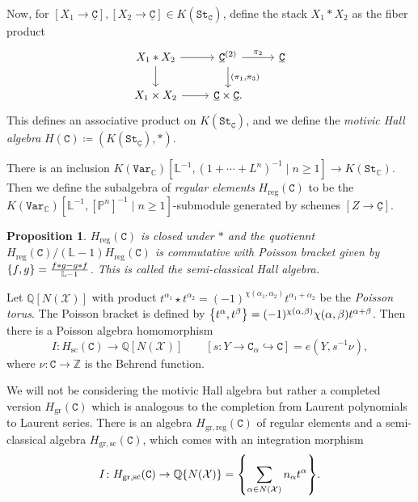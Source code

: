 \documentclass[leqno, openany]{memoir}
\newtheorem{prop}[thm]{Proposition}
\theoremstyle{definition}
\theoremstyle{remark}
\theoremstyle{plain}
\theoremstyle{definition}
\theoremstyle{remark}
\newcommand{\C}{\mathbb{C}}
\newcommand{\Z}{\mathbb{Z}}
\newcommand{\Q}{\mathbb{Q}}
\renewcommand{\L}{\mathbb{L}}
\renewcommand{\P}{\mathbb{P}}
\newcommand{\mc}[1]{\mathcal{#1}}
\newcommand{\mr}[1]{\mathrm{#1}}
\newcommand{\mt}[1]{\mathtt{#1}}
\newcommand{\ul}[1]{\underline{#1}}
\begin{document}
Now, for $[X_1 \to \mt{\ul{C}}], [X_2 \to \mt{\ul{C}}] \in K(\mt{St}_{\mt{\ul{C}}})$, define the stack $X_1 * X_2$ as the fiber product
\begin{equation*}
\begin{tikzcd}
    X_1 * X_2 \ar{r} \ar{d} & \mt{\ul{C}}^{(2)} \ar{r}{\pi_2} \ar{d}{(\pi_1, \pi_3)} & \mt{\ul{C}} \\
    X_1 \times X_2 \ar{r} & \mt{\ul{C}} \times \mt{\ul{C}}.
\end{tikzcd}
\end{equation*}
This defines an associative product on $K(\mt{St}_{\mt{\ul{C}}})$, and we define the \textit{motivic Hall algebra} $H(\mt{C}) \coloneqq (K(\mt{St}_{\mt{\ul{C}}}), *)$.

There is an inclusion $K(\mt{Var}_{\C})[\L^{-1}, (1 + \cdots + L^n)^{-1} \mid n \geq 1] \to K(\mt{St}_{\C})$. Then we define the subalgebra of \textit{regular elements} $H_{\mr{reg}}(\mt{C})$ to be the $K(\mt{Var}_{\C})[\L^{-1}, [\P^n]^{-1} \mid n \geq 1]$-submodule generated by schemes $[Z \to \mt{\ul{C}}]$.

\begin{prop}
    $H_{\mr{reg}}(\mt{C})$ is closed under $*$ and the quotiennt $H_{\mr{reg}}(\mt{C}) / (\L - 1) H_{\mr{reg}}(\mt{C})$ is commutative with Poisson bracket given by $\qty{f, g} = \frac{f * g - g * f}{\L - 1}$. This is called the \textit{semi-classical Hall algebra}.
\end{prop}

Let $\Q[N(\mc{X})]$ with product $t^{\alpha_1} \star t^{\alpha_2} = (-1)^{\chi(\alpha_1, \alpha_2)} t^{\alpha_1 + \alpha_2}$ be the \textit{Poisson torus}. The Poisson bracket is defined by $\qty{t^{\alpha}, t^{\beta}} = (-1)^{\chi(\alpha, \beta)} \chi(\alpha, \beta) t^{\alpha + \beta}$. Then there is a Poisson algebra homomorphism
\[ I \colon H_{\mr{sc}}(\mt{C}) \to \Q[N(\mc{X})] \qquad [s \colon Y \to \mt{C}_{\alpha} \hookrightarrow \mt{C}] = e(Y, s^{-1} \nu), \]
where $\nu \colon \mt{C} \to \Z$ is the Behrend function.

We will not be considering the motivic Hall algebra but rather a completed version $H_{\mr{gr}}(\mt{C})$ which is analogous to the completion from Laurent polynomials to Laurent series. There is an algebra $H_{\mr{gr,reg}}(\mt{C})$ of regular elements and a semi-classical algebra $H_{\mr{gr,sc}}(\mt{C})$, which comes with an integration morphism 
\[ I \colon H_{\mr{gr,sc}}(\mt{C}) \to \Q \qty{N(\mc{X})} = \qty{\sum_{\alpha \in N(\mc{X})} n_{\alpha} t^{\alpha}}. \]
\end{document}
